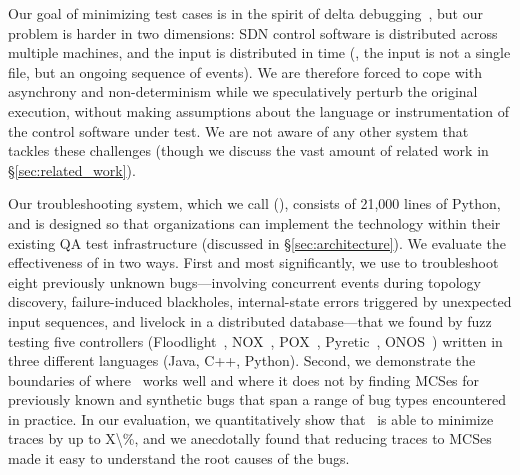 Our goal of minimizing test cases is in the spirit of
delta debugging~\cite{Zeller:1999:YMP:318773.318946}, but our
problem is harder in two dimensions: SDN control software is distributed
across multiple machines, and the input is distributed in time (\ie, the
input is not a single file, but an ongoing sequence of events).
We are therefore forced to cope with asynchrony and non-determinism while
we speculatively perturb the original execution,
without making assumptions about the language
or instrumentation of the control software under test.
We are not aware of any other system that tackles these
challenges (though we discuss the vast amount of related work in \S\ref{sec:related_work}).

Our troubleshooting system, which we call {\projectname} ({\projectmeaning}),
consists of 21,000 lines of Python, and is designed so that organizations can
implement the technology within their existing QA test infrastructure (discussed in
\S\ref{sec:architecture}). We evaluate the effectiveness of {\projectname} in
two ways. First and most significantly, we use {\projectname} to troubleshoot
\num{eight} previously unknown bugs---involving concurrent events during topology discovery,
failure-induced blackholes, internal-state errors triggered by unexpected
input sequences, and livelock in a distributed database---that we found
by fuzz testing \num{five} controllers (Floodlight~\cite{floodlight}, NOX~\cite{nox},
POX~\cite{pox}, Pyretic~\cite{frenetic}, ONOS~\cite{ONOS})
written in three different languages (Java, C++, Python).
Second, we demonstrate the
boundaries of where \projectname~works well and where it does not by
finding MCSes for previously known and synthetic bugs that span a range of bug types encountered in
practice. In our evaluation, we quantitatively show that \projectname~is able to minimize traces
by up to \num{X\%}, and we anecdotally found that reducing
traces to MCSes made it easy to understand the root causes of the bugs.
